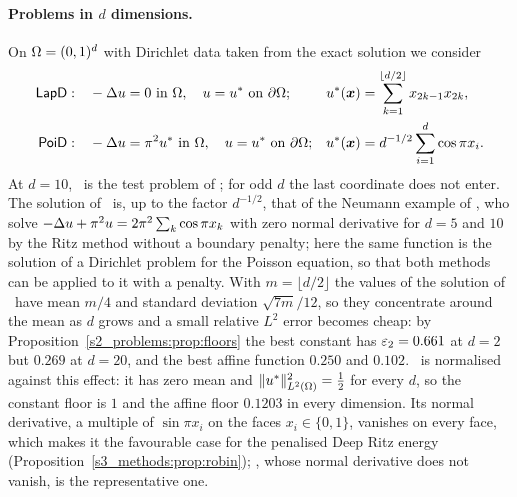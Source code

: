 \paragraph{Problems in $d$ dimensions.}
On $\Omega=(0,1)^d$ with Dirichlet data taken from the exact solution we consider
\begin{align}
\textsf{LapD}:&\quad -\Delta u=0\ \text{in }\Omega,\quad u=u^{*}\ \text{on }\partial\Omega;
&u^{*}(\boldsymbol{x})&=\sum_{k=1}^{\lfloor d/2\rfloor}x_{2k-1}x_{2k},\label{s2_problems:eq:p1}\\
\textsf{PoiD}:&\quad -\Delta u=\pi^2u^{*}\ \text{in }\Omega,\quad u=u^{*}\ \text{on }\partial\Omega;
&u^{*}(\boldsymbol{x})&=d^{-1/2}\sum_{i=1}^{d}\cos\pi x_i .\label{s2_problems:eq:p2}
\end{align}
At $d=10$, \Pone\ is the test problem of \citet[Sec.~3.2]{eyu2018}; for odd $d$ the last
coordinate does not enter.
The solution of \Ptwo\ is, up to the factor $d^{-1/2}$, that of the Neumann example of
\citet[Sec.~3.3]{eyu2018}, who solve $-\Delta u+\pi^2u=2\pi^2\sum_k\cos\pi x_k$ with zero
normal derivative for $d=5$ and $10$ by the Ritz method without a boundary penalty; here
the same function is the solution of a Dirichlet problem for the Poisson equation, so
that both methods can be applied to it with a penalty. With $m=\lfloor d/2\rfloor$
the values of the solution of \Pone\ have mean $m/4$ and standard deviation $\sqrt{7m}/12$, so they concentrate around
the mean as $d$ grows and a small relative $L^2$ error becomes cheap:
by Proposition~\ref{s2_problems:prop:floors} the best constant has $\varepsilon_{2}=0.661$ at $d=2$ but
$0.269$ at $d=20$, and the best affine function $0.250$ and $0.102$. \Ptwo\ is normalised
against this effect: it has zero mean and $\lVert u^{*}\rVert_{L^2(\Omega)}^2=\tfrac12$ for every $d$, so
the constant floor is $1$ and the affine floor $0.1203$ in every dimension. Its normal
derivative, a multiple of $\sin\pi x_i$ on the faces $x_i\in\{0,1\}$, vanishes on every face, which makes it the favourable
case for the penalised Deep Ritz energy (Proposition~\ref{s3_methods:prop:robin}); \Pone,
whose normal derivative does not vanish, is the representative one.

